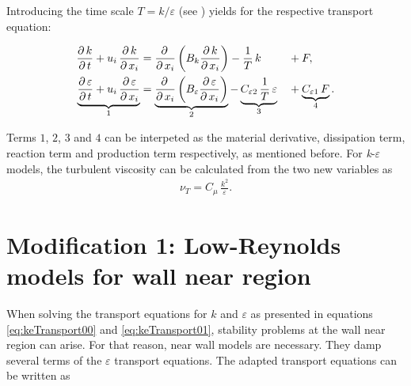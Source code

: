 \noii Introducing the time scale $T = k/\varepsilon$ (see \citep{adams2015}) yields for the respective transport equation:

\begin{alignat}{3} \label{eq:keTransport00}
		\frac{\partial\,k}{\partial\,t} + u_i\,\frac{\partial\,k}{\partial\,x_i}
		&=
		\frac{\partial\,}{\partial\,x_i}\left(  B_k \frac{\partial\,k}{\partial\,x_i} \right) 
		-
		\frac{1}{T}\,k
		&&+
		F, \\ \label{eq:keTransport01}
		\underbrace{\frac{\partial\,\varepsilon}{\partial\,t} + u_i\,\frac{\partial\,\varepsilon}{\partial\,x_i}}_{1}
		&=
		\underbrace{\frac{\partial\,}{\partial\,x_i}\left( B_\varepsilon \frac{\partial\,\varepsilon}{\partial\,x_i} \right)}_{2} 
		-
		\underbrace{C_{\varepsilon 2}\,\frac{1}{T}\,\varepsilon}_{3}
		&&+
		\underbrace{C_{\varepsilon 1}\,F}_{4}.
\end{alignat}

\noii Terms $1$, $2$, $3$ and $4$ can be interpeted as the material derivative, dissipation term, reaction term and production term respectively, as mentioned before. For \textit{k}-$\varepsilon$ models, the turbulent viscosity can be calculated from the two new variables as
\begin{align}
	\nu_T = C_\mu\,\frac{k^2}{\varepsilon}.
\end{align}





\section{Modification 1: Low-Reynolds models for wall near region} %
\label{sec:modification_1_low_reynolds_models_for_wall_near_region}


When solving the transport equations for $k$ and $\varepsilon$ as presented in equations \eqref{eq:keTransport00} and \eqref{eq:keTransport01}, stability problems at the wall near region can arise. For that reason, near wall models are necessary. They damp several terms of the $\varepsilon$ transport equations. The adapted transport equations can be written as

